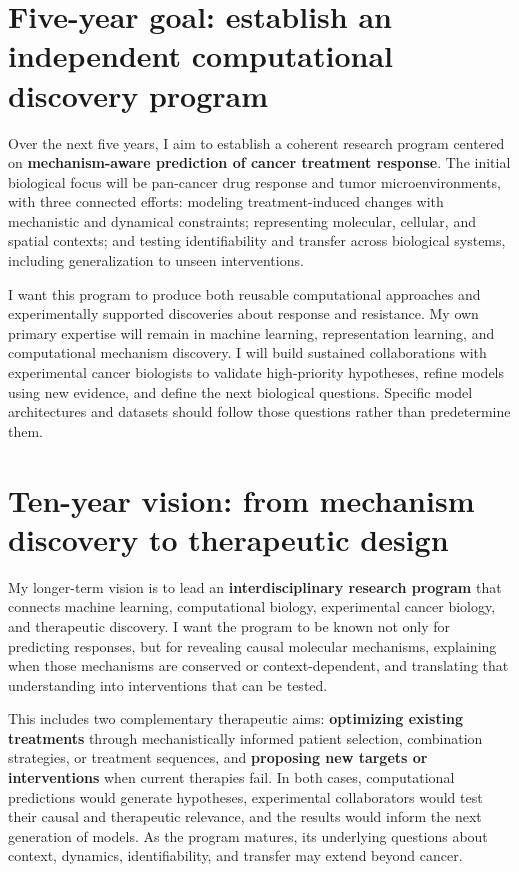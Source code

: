 \documentclass[11pt]{article}
\begin{document}
\section*{Five-year goal: establish an independent computational discovery program}

Over the next five years, I aim to establish a coherent research program centered on \textbf{mechanism-aware prediction of cancer treatment response}. The initial biological focus will be pan-cancer drug response and tumor microenvironments, with three connected efforts: modeling treatment-induced changes with mechanistic and dynamical constraints; representing molecular, cellular, and spatial contexts; and testing identifiability and transfer across biological systems, including generalization to unseen interventions.

I want this program to produce both reusable computational approaches and experimentally supported discoveries about response and resistance. My own primary expertise will remain in machine learning, representation learning, and computational mechanism discovery. I will build sustained collaborations with experimental cancer biologists to validate high-priority hypotheses, refine models using new evidence, and define the next biological questions. Specific model architectures and datasets should follow those questions rather than predetermine them.

\section*{Ten-year vision: from mechanism discovery to therapeutic design}

My longer-term vision is to lead an \textbf{interdisciplinary research program} that connects machine learning, computational biology, experimental cancer biology, and therapeutic discovery. I want the program to be known not only for predicting responses, but for revealing causal molecular mechanisms, explaining when those mechanisms are conserved or context-dependent, and translating that understanding into interventions that can be tested.

This includes two complementary therapeutic aims: \textbf{optimizing existing treatments} through mechanistically informed patient selection, combination strategies, or treatment sequences, and \textbf{proposing new targets or interventions} when current therapies fail. In both cases, computational predictions would generate hypotheses, experimental collaborators would test their causal and therapeutic relevance, and the results would inform the next generation of models. As the program matures, its underlying questions about context, dynamics, identifiability, and transfer may extend beyond cancer.
\end{document}
